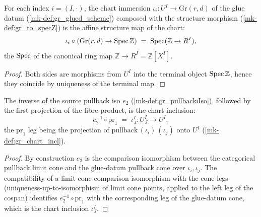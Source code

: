 \begin{lemma}\label{mk-lem:gr_ι_toSpecZ}
  \leanok

  For each index \(i = (I, \cdot)\), the chart immersion \(\iota_i : U^I \to
  \mathrm{Gr}(r,d)\) of the glue datum (\ref{mk-def:gr_glued_scheme}) composed with
  the structure morphism (\ref{mk-def:gr_to_specZ}) is the affine structure map of
  the chart:
  \[
    \iota_i \circ (\mathrm{Gr}(r,d) \to \operatorname{Spec} \mathbb{Z})
      \;=\; \operatorname{Spec}(\mathbb{Z} \to R^I),
  \]
  the \(\operatorname{Spec}\) of the canonical ring map \(\mathbb{Z} \to R^I =
  \mathbb{Z}[X^I]\).
\end{lemma}
\begin{proof}
  \leanok
  Both sides are morphisms from \(U^I\) into the terminal object \(\operatorname{Spec}
  \mathbb{Z}\), hence they coincide by uniqueness of the terminal map.
\end{proof}

\begin{lemma}\label{mk-lem:gr_pullbackιIso_inv_fst}
  \leanok

  The inverse of the source pullback iso \(e_2\) (\ref{mk-def:gr_pullbackιIso}),
  followed by the first projection of the fibre product, is the chart inclusion:
  \[
    e_2^{-1} \circ \mathrm{pr}_1 \;=\; \iota^I_J : U^I_J \to U^I ,
  \]
  the \(\mathrm{pr}_1\) leg being the projection of
  \(\mathrm{pullback}\,(\iota_i)\,(\iota_j)\) onto \(U^I\)
  (\ref{mk-def:gr_chart_incl}).
\end{lemma}
\begin{proof}
  \leanok
  By construction \(e_2\) is the comparison isomorphism between the categorical
  pullback limit cone and the glue-datum pullback cone over \(\iota_i, \iota_j\).
  The compatibility of a limit-cone comparison isomorphism with the cone legs
  (uniqueness-up-to-isomorphism of limit cone points, applied to the left leg of
  the cospan) identifies \(e_2^{-1} \circ \mathrm{pr}_1\) with the corresponding
  leg of the glue-datum cone, which is the chart inclusion \(\iota^I_J\).
\end{proof}

